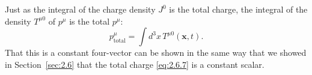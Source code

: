 Just as the integral of the charge density \(J^0\) is the total charge, the
integral of the density \(T^{\mu0}\) of \(p^\mu\) is the total \(p^\mu\):
\begin{equation}
  p^\mu_{\mathrm{total}}
  =\int d^3x\,T^{\mu0}(\mathbf x,t).
  \tag{2.8.14}\label{eq:2.8.14}
\end{equation}
That this is a constant four-vector can be shown in the same way that we showed
in Section~\ref{sec:2.6} that the total charge \eqref{eq:2.6.7} is a constant
scalar.
